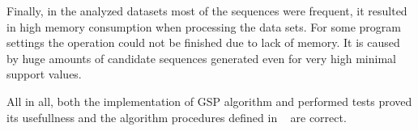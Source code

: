 \documentclass[journal,a4paper]{IEEEtran}
\begin{document}
Finally, in the analyzed datasets most of the sequences were frequent, it resulted in high memory consumption when processing the data sets. For some program settings the operation could not be finished due to lack of memory. It is caused by huge amounts of candidate sequences generated even for very high minimal support values.

All in all, both the implementation of GSP algorithm and performed tests proved its usefullness and the algorithm procedures defined in ~\cite{gsp} are correct.


\end{document}
